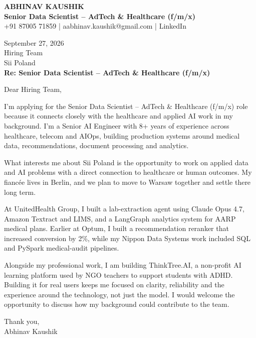 \documentclass[10pt,a4paper]{article}
\begin{document}
\begin{center}
{\Large\bfseries ABHINAV KAUSHIK}\\[2pt]
{\bfseries Senior Data Scientist – AdTech \& Healthcare (f/m/x)}\\[2pt]
+91 87005 71859 \quad | \quad aabhinav.kaushik@gmail.com \quad | \quad LinkedIn
\end{center}
\vspace{8pt}
September 27, 2026\\[6pt]
Hiring Team\\
Sii Poland\\[4pt]
\textbf{Re: Senior Data Scientist – AdTech \& Healthcare (f/m/x)}

Dear Hiring Team,

I’m applying for the Senior Data Scientist – AdTech \& Healthcare (f/m/x) role because it connects closely with the healthcare and applied AI work in my background. I’m a Senior AI Engineer with 8+ years of experience across healthcare, telecom and AIOps, building production systems around medical data, recommendations, document processing and analytics.

What interests me about Sii Poland is the opportunity to work on applied data and AI problems with a direct connection to healthcare or human outcomes. My fiancée lives in Berlin, and we plan to move to Warsaw together and settle there long term.

At UnitedHealth Group, I built a lab-extraction agent using Claude Opus 4.7, Amazon Textract and LIMS, and a LangGraph analytics system for AARP medical plans. Earlier at Optum, I built a recommendation reranker that increased conversion by 2\%, while my Nippon Data Systems work included SQL and PySpark medical-audit pipelines.

Alongside my professional work, I am building ThinkTree.AI, a non-profit AI learning platform used by NGO teachers to support students with ADHD. Building it for real users keeps me focused on clarity, reliability and the experience around the technology, not just the model. I would welcome the opportunity to discuss how my background could contribute to the team.

Thank you,\\
Abhinav Kaushik
\end{document}
